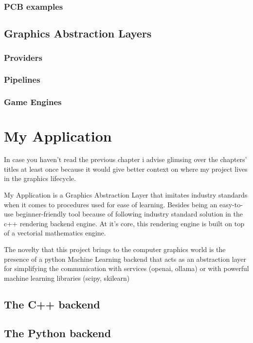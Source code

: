         \subsection{PCB examples}

    \section{Graphics Abstraction Layers}

        \subsection{Providers}

        \subsection{Pipelines}

        \subsection{Game Engines}


\chapter{My Application}

    In case you haven't read the previous chapter i advise glimsing over the chapters' titles at least once because it would give better context on where my project lives in the graphics lifecycle.

    My Application is a Graphics Abstraction Layer that imitates industry standards when it comes to procedures used for ease of learning.
    Besides being an easy-to-use beginner-friendly tool because of following industry standard solution in the c++ rendering backend engine. At it's core, this rendering engine is built on top of a vectorial mathematics engine.

    The novelty that this project brings to the computer graphics world is the presence of a python Machine Learning backend that acts as an abstraction layer for simplifying the communication with services (openai, ollama) or with powerful machine learning libraries (scipy, skilearn) 
 
    \section{The C++    backend}
    \section{The Python backend}

